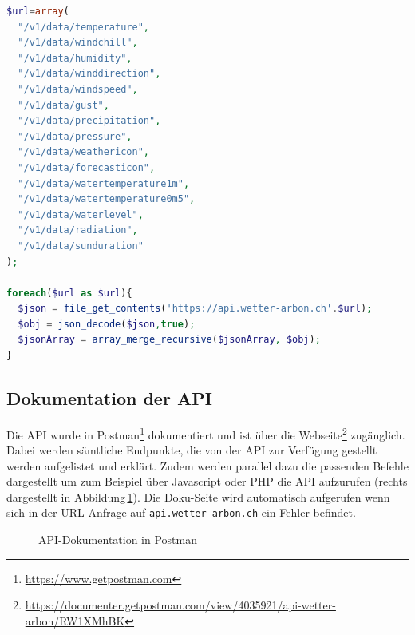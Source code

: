 \vspace{3mm}
\begin{lstlisting}[label=lst:foreach,caption=API-Abfrage auf Stufe Kategorie, language=php, style=php]
$url=array(
  "/v1/data/temperature",
  "/v1/data/windchill",
  "/v1/data/humidity",
  "/v1/data/winddirection",
  "/v1/data/windspeed",
  "/v1/data/gust",
  "/v1/data/precipitation",
  "/v1/data/pressure",
  "/v1/data/weathericon",
  "/v1/data/forecasticon",
  "/v1/data/watertemperature1m",
  "/v1/data/watertemperature0m5",
  "/v1/data/waterlevel",
  "/v1/data/radiation",
  "/v1/data/sunduration"
);

foreach($url as $url){
  $json = file_get_contents('https://api.wetter-arbon.ch'.$url);
  $obj = json_decode($json,true);
  $jsonArray = array_merge_recursive($jsonArray, $obj);
}
\end{lstlisting}
\vspace{3mm}



\subsection{Dokumentation der API}
Die API wurde in Postman\footnote{\url{https://www.getpostman.com}} dokumentiert und ist über die Webseite\footnote{\url{https://documenter.getpostman.com/view/4035921/api-wetter-arbon/RW1XMhBK}} zugänglich. Dabei werden sämtliche Endpunkte, die von der API zur Verfügung gestellt werden aufgelistet und erklärt. Zudem werden parallel dazu die passenden Befehle dargestellt um zum Beispiel über Javascript oder PHP die API aufzurufen (rechts dargestellt in Abbildung\,\ref{img:postman}). Die Doku-Seite wird automatisch aufgerufen wenn sich in der URL-Anfrage auf \texttt{api.wetter-arbon.ch} ein Fehler befindet.

\begin{figure}[htbp!]
	\centering
	\caption{API-Dokumentation in Postman}
	\label{img:postman}
\end{figure}

